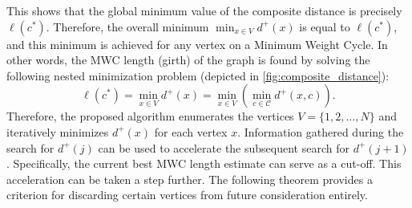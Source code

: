 \documentclass{article}
\begin{document}
This shows that the global minimum value of the composite distance is precisely $\ell(c^*)$. Therefore, the overall minimum $\min_{x\in V} d^+(x)$ is equal to $\ell(c^*)$, and this minimum is achieved for any vertex on a Minimum Weight Cycle.
In other words, the MWC length (girth) of the graph is found by solving the following nested minimization problem (depicted in \ref{fig:composite_distance}):
\begin{equation}\label{eq_girth_thm}
\ell(c^*) = \min_{x\in V} d^+(x) = \min_{x\in V}\left( \min_{c\in \mathscr{C}} d^+(x,c)\right).
\end{equation}
Therefore, the proposed algorithm enumerates the vertices $V=\{1, 2, \dots, N\}$ and iteratively minimizes $d^+(x)$ for each vertex $x$. Information gathered during the search for $d^+(j)$ can be used to accelerate the subsequent search for $d^+(j+1)$. Specifically, the current best MWC length estimate can serve as a cut-off. 
This acceleration can be taken a step further. The following theorem provides a criterion for discarding certain vertices from future consideration entirely.
\end{document}
